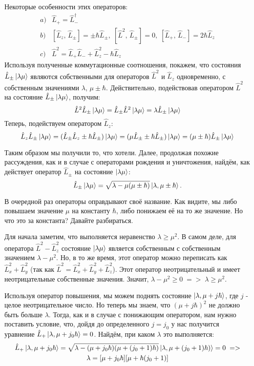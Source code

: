 Некоторые особенности этих операторов:
\begin{equation*}
    \begin{aligned}
        a)& \hat{L}_+ = \hat{L}^{\dagger}_-  \\
        b)& \left[\hat{L}_z, \, \hat{L}_{\pm}\right] = \pm\hbar \hat{L}_{\pm},\; \left[\hat{L}^2, \, \hat{L}_{\pm}\right] = 0, \; \left[\hat{L}_+, \, \hat{L}_-\right] = 2\hbar \hat{L}_z \\
        c)& \hat{L}^2 = \hat{L}_+\hat{L}_- + \hat{L}^2_z - \hbar\hat{L}_z
    \end{aligned}
\end{equation*}
Используя полученные коммутационные соотношения, покажем, что состояния $\hat{L}_{\pm}\ket{\lambda\mu}$ являются собственными для операторов $\hat{L}^2$ и $\hat{L}_z$ одновременно, с собственным значениями $\lambda$, $\mu \pm \hbar$. Действительно, подействовав оператором $\hat{L}^2$ на состояние $\hat{L}_{\pm}\ket{\lambda\mu}$, получим:
\[
\hat{L}^2\hat{L}_{\pm}\ket{\lambda\mu} = \hat{L}_{\pm}\hat{L}^2\ket{\lambda\mu} = \lambda\hat{L}_{\pm}\ket{\lambda\mu}
\]
Теперь, подействуем оператором $\hat{L}_z$:
\[
\hat{L}_z\hat{L}_{\pm}\ket{\lambda\mu} = (\hat{L}_{\pm}\hat{L}_z \pm \hbar\hat{L}_{\pm})\ket{\lambda\mu} = (\mu\hat{L}_{\pm} \pm \hbar\hat{L}_{\pm})\ket{\lambda\mu} = (\mu \pm \hbar)\hat{L}_{\pm}\ket{\lambda\mu}
\]

Таким образом мы получили то, что хотели. Далее, продолжая похожие рассуждения, как и в случае с операторами рождения и уничтожения, найдём, как действует оператор $\hat{L}_{\pm}$ на состояние $\ket{\lambda\mu}$:
\[
\hat{L}_{\pm}\ket{\lambda\mu} = \sqrt{\lambda - \mu(\mu \pm \hbar)}\ket{\lambda,\mu\pm\hbar}.
\]

В очередной раз операторы оправдывают своё название. Как видите, мы либо повышаем значение $\mu$ на константу $\hbar$, либо понижаем её на то же значение. Но что это за константа? Давайте разбираться.

Для начала заметим, что выполняется неравенство $\lambda \geq \mu^2$. В самом деле, для оператора $\hat{L}^2 - \hat{L}^2_z$ состояние $\ket{\lambda\mu}$ является собственным с собственным значением $\lambda - \mu^2$. Но, в то же время, этот оператор можно переписать как $\hat{L}^2_x + \hat{L}^2_y$ (так как $\hat{L}^2 = \hat{L}^2_x + \hat{L}^2_y + \hat{L}^2_z$). Этот оператор неотрицательный и имеет неотрицательные собственные значения. Значит, $\lambda - \mu^2 \geq 0\; => \; \lambda \geq \mu^2$.

Используя оператор повышения, мы можем поднять состояние $\ket{\lambda,\mu + j\hbar}$, где $j$ - целое неотрицательное число. Но теперь мы знаем, что $(\mu + j\hbar)^2$ не должно быть больше $\lambda$. Тогда, как и в случае с понижающим оператором, нам нужно поставить условие, что, дойдя до определенного $j = j_0$ у нас получится уравнение $\hat{L}_+\ket{\lambda, \mu + j_0\hbar} = 0$. Найдём, при каком $\lambda$ это выполняется:
\begin{multline*}
\hat{L}_{+}\ket{\lambda,\mu + j_0\hbar} = \sqrt{\lambda - (\mu+j_0\hbar)(\mu + (j_0 + 1)\hbar)}\ket{\lambda,\mu +(j_0 + 1)\hbar)} = 0\; => \\ \lambda = [\mu + j_0\hbar][\mu + \hbar(j_0 + 1)]
\end{multline*}

